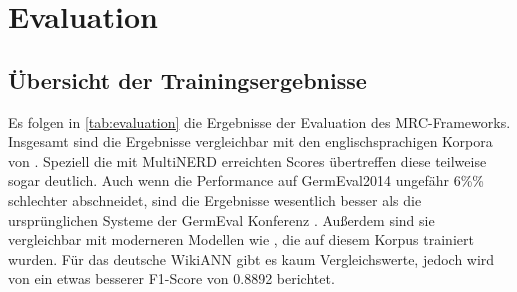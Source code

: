 \chapter{Evaluation}
\label{ch:Evaluation}

\section{Übersicht der Trainingsergebnisse}
\label{ch:Evaluation:sec:Übersicht_der_Trainingsergebnisse}

Es folgen in \autoref{tab:evaluation} die Ergebnisse der Evaluation des MRC-Frameworks. Insgesamt sind die Ergebnisse vergleichbar mit den englischsprachigen Korpora von \cite[6]{li2019unified}. Speziell die mit MultiNERD erreichten Scores übertreffen diese teilweise sogar deutlich. Auch wenn die Performance auf GermEval2014 ungefähr 6\%\% schlechter abschneidet, sind die Ergebnisse wesentlich besser als die ursprünglichen Systeme der GermEval Konferenz \parencite[6]{germeval2014}. Außerdem sind sie vergleichbar mit moderneren Modellen wie \cite[3,4]{riedl-pado-shootout}, die auf diesem Korpus trainiert wurden. Für das deutsche WikiANN gibt es kaum Vergleichswerte, jedoch wird von \cite{Schiesser_2023} ein etwas besserer F1-Score von 0.8892 berichtet.

\begin{table}[!htbp]
	\centering
	\caption{Evaluation des MRC-Frameworks}
	\label{tab:evaluation}
\end{table}
